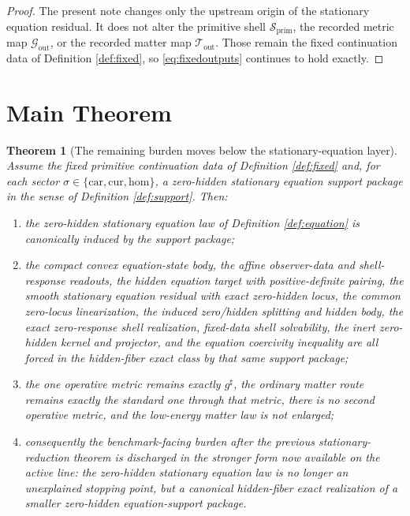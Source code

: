 \documentclass[11pt]{article}
\newcommand{\CompletedMetric}{g^{\sharp}}
\newcommand{\Car}{\mathrm{car}}
\newcommand{\Cur}{\mathrm{cur}}
\newcommand{\Hom}{\mathrm{hom}}
\newcommand{\PrimShell}{\mathcal S_{\mathrm{prim}}}
\newcommand{\MetricOut}{\mathscr G_{\mathrm{out}}}
\newcommand{\MatterOut}{\mathscr T_{\mathrm{out}}}
\newtheorem{theorem}{Theorem}
\begin{document}
\begin{proof}
The present note changes only the upstream origin of the stationary equation residual. It does not alter the primitive shell \(\PrimShell\), the recorded metric map \(\MetricOut\), or the recorded matter map \(\MatterOut\). Those remain the fixed continuation data of Definition \ref{def:fixed}, so \eqref{eq:fixedoutputs} continues to hold exactly.
\end{proof}

\section{Main Theorem}

\begin{theorem}[The remaining burden moves below the stationary-equation layer]
\label{thm:main}
Assume the fixed primitive continuation data of Definition \ref{def:fixed} and, for each sector \(\sigma\in\{\Car,\Cur,\Hom\}\), a zero-hidden stationary equation support package in the sense of Definition \ref{def:support}. Then:
\begin{enumerate}
    \item the zero-hidden stationary equation law of Definition \ref{def:equation} is canonically induced by the support package;
    \item the compact convex equation-state body, the affine observer-data and shell-response readouts, the hidden equation target with positive-definite pairing, the smooth stationary equation residual with exact zero-hidden locus, the common zero-locus linearization, the induced zero/hidden splitting and hidden body, the exact zero-response shell realization, fixed-data shell solvability, the inert zero-hidden kernel and projector, and the equation coercivity inequality are all forced in the hidden-fiber exact class by that same support package;
    \item the one operative metric remains exactly \(\CompletedMetric\), the ordinary matter route remains exactly the standard one through that metric, there is no second operative metric, and the low-energy matter law is not enlarged;
    \item consequently the benchmark-facing burden after the previous stationary-reduction theorem is discharged in the stronger form now available on the active line: the zero-hidden stationary equation law is no longer an unexplained stopping point, but a canonical hidden-fiber exact realization of a smaller zero-hidden equation-support package.
\end{enumerate}
\end{theorem}
\end{document}
